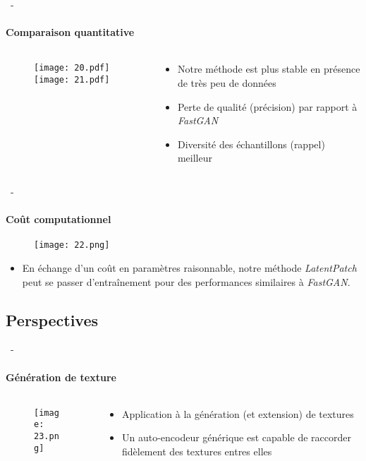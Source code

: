 \documentclass[aspectratio=169, 22pt]{beamer}
\begin{document}
\begin{frame}{\secname~- \subsecname}
  \framesubtitle{Comparaison quantitative}
    \begin{columns}
    \begin{column}{0.5\linewidth}
      \begin{figure}
        \texttt{[image: 20.pdf]}
        \texttt{[image: 21.pdf]}
      \end{figure}
    \end{column}
    \begin{column}{0.5\linewidth}
      \begin{itemize}
      \item Notre méthode est plus stable en présence de très peu de données
      \item Perte de qualité (précision) par rapport à \emph{FastGAN}
      \item Diversité des échantillons (rappel) meilleur
      \end{itemize}
    \end{column}
  \end{columns}  
\end{frame}

\begin{frame}{\secname~- \subsecname}
  \framesubtitle{Coût computationnel}
  \begin{figure}
    \texttt{[image: 22.png]}
  \end{figure}
  \begin{itemize}
  \item En échange d'un coût en paramètres raisonnable, notre méthode
    \emph{LatentPatch} peut se passer d'entraînement pour des performances
    similaires à \emph{FastGAN}.
  \end{itemize}
\end{frame}

\subsection{Perspectives}
\begin{frame}{\secname~- \subsecname}
  \framesubtitle{Génération de texture}
  \begin{columns}
    \begin{column}{0.5\linewidth}
      \begin{figure}
        \centering
        \texttt{[image: 23.png]}
      \end{figure}
    \end{column}
    \begin{column}{0.5\linewidth}
      \begin{itemize}
      \item Application à la génération (et extension) de textures
      \item Un auto-encodeur générique est capable de raccorder fidèlement des textures entres elles
      \end{itemize}
    \end{column}
  \end{columns}
\end{frame}
\end{document}
